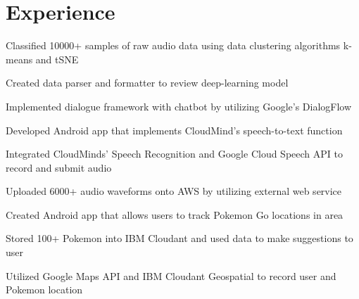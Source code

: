 \documentclass[]{deedy-resume-openfont}
\begin{document}
\begin{minipage}[t]{0.66\textwidth} 


\section{Experience}

\sectionsep
\begin{tightemize} 
\item Classified 10000+ samples of raw audio data using data clustering algorithms k-means and tSNE
\item Created data parser and formatter to review deep-learning model
\item Implemented dialogue framework with chatbot by utilizing Google's DialogFlow
\end{tightemize}
\sectionsep

\begin{tightemize} 
\item Developed Android app that implements CloudMind's speech-to-text function
\item Integrated CloudMinds’ Speech Recognition and Google Cloud Speech API to record and submit audio
\item Uploaded 6000+ audio waveforms onto AWS by utilizing external web service 
\end{tightemize}
\sectionsep

\begin{tightemize} 
\item Created Android app that allows users to track Pokemon Go locations in area 
\item Stored 100+ Pokemon into IBM Cloudant and used data to make suggestions to user
\item  Utilized Google Maps API and IBM Cloudant Geospatial to record user and Pokemon location
\end{tightemize}
\sectionsep


\end{minipage}
\end{document}
